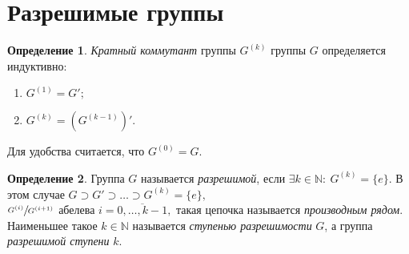 \documentclass[a4paper, 14pt]{extarticle}
\newcommand{\naturals}{\mathbb{N}}
\newcommand{\suchthat}{{:}{ } \ }
\theoremstyle{definition}
\newtheorem{definition}{Определение}
\theoremstyle{plain}
\numberwithin{theorem}{section}
\numberwithin{definition}{section}
\numberwithin{statement}{section}
\numberwithin{lemma}{section}
\numberwithin{consequence}{section}
\begin{document}
        \section{Разрешимые группы}
        \setcounter{definition}{0}
        \begin{definition}
        \textit{Кратный коммутант} группы $G^{(k)}$ группы $G$ определяется индуктивно:
            \begin{enumerate}
                \setlength\itemsep{0.1em}
                \item ${G^{(1)} = G';}$
                \item ${G^{(k)} = (G^{(k - 1)})'.}$
            \end{enumerate}
        Для удобства считается, что ${G^{(0)} = G.}$
        \end{definition}

        \begin{definition}
            Группа $G$ называется \textit{разрешимой}, если ${\exists k \in \naturals\suchthat G^{(k)} = \{e\}.}$ В этом случае ${G \supset G' \supset \ldots \supset G^{(k)} = \{e\},}$\\ ${\sfrac{G^{(i)}}{G^{(i + 1)}}}$ абелева ${i = \overline{0, \ldots, k - 1},}$ такая цепочка называется \textit{производным рядом}.
            Наименьшее такое ${k \in \naturals}$ называется \textit{ступенью разрешимости} $G$, а группа \textit{разрешимой ступени} $k$.
        \end{definition}
\end{document}
